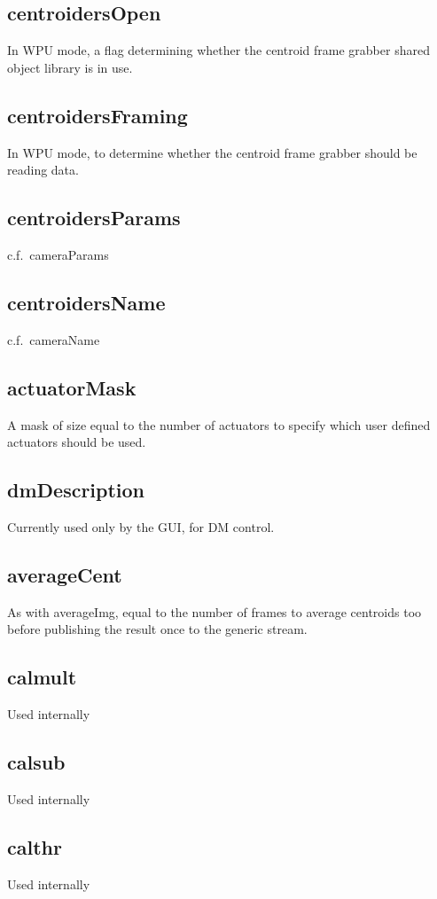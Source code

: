 \documentclass[a4,10pt]{article}
\begin{document}
\subsection{centroidersOpen}
In WPU mode, a flag determining whether the centroid frame grabber
shared object library is in use.

\subsection{centroidersFraming}
In WPU mode, to determine whether the centroid frame grabber should be
reading data.

\subsection{centroidersParams}
c.f.\ cameraParams

\subsection{centroidersName}
c.f.\ cameraName

\subsection{actuatorMask}
A mask of size equal to the number of actuators to specify which user
defined actuators should be used.

\subsection{dmDescription}
Currently used only by the GUI, for DM control.

\subsection{averageCent}
As with averageImg, equal to the number of frames to average centroids
too before publishing the result once to the generic stream.

\subsection{calmult}
Used internally
\subsection{calsub}
Used internally
\subsection{calthr}
Used internally
\end{document}

